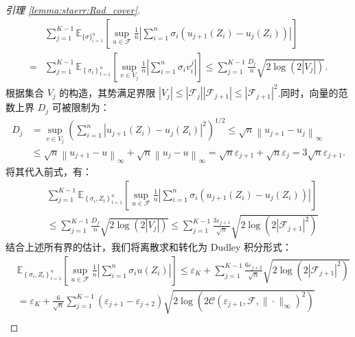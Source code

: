 \begin{proof}[引理 \ref{lemma:staerr:Rad_cover}]
\begin{equation*}
\begin{aligned}
&\sum_{j=1}^{K-1} \mathbb{E}_{\{\sigma\}_{i=1}^{n}}\left[\sup _{u \in \mathcal{F}} \frac{1}{n}\left|\sum_{i=1}^{n} \sigma_{i}\left(u_{j+1}\left(Z_{i}\right)-u_{j}\left(Z_{i}\right)\right)\right|\right]\\
=&\sum_{j=1}^{K-1} \mathbb{E}_{\left\{\sigma_{t}\right\}_{t=1}^{n}}\left[\sup _{v \in V_{j}} \frac{1}{n} \left| \sum_{i=1}^{n} \sigma_{i} v_{i}^{j}\right|\right] \leq \sum_{j=1}^{K-1} \frac{D_{j}}{n} \sqrt{2 \log \left(2\left|V_{j}\right|\right)}.
\end{aligned}
\end{equation*}
根据集合 $V_{j}$ 的构造，其势满足界限 $\left|V_{j}\right| \leq\left|\mathcal{F}_{j}\right|\left|\mathcal{F}_{j+1}\right| \leq\left|\mathcal{F}_{j+1}\right|^{2}$.同时，向量的范数上界 $D_j$ 可被限制为：
$$ \begin{aligned}
     D_j &= \sup_{v \in V_j} \left(\sum_{i=1}^{n}\left|u_{j+1}\left(Z_{i}\right)-u_{j}\left(Z_{i}\right)\right|^{2}\right)^{1 / 2} \leq \sqrt{n}\left\|u_{j+1}-u_{j}\right\|_{\infty} \\ &\leq \sqrt{n}\left\|u_{j+1}-u\right\|_{\infty}+\sqrt{n}\left\|u_{j}-u\right\|_{\infty} = \sqrt{n} \varepsilon_{j+1}+\sqrt{n} \varepsilon_{j} = 3 \sqrt{n} \varepsilon_{j+1}. 
\end{aligned} $$
将其代入前式，有：
\begin{equation*}
\begin{aligned}
&\sum_{j=1}^{K-1} \mathbb{E}_{\left\{\sigma_{i}, Z_{t}\right\}_{t=1}^{n}}\left[\sup _{u \in \mathcal{F}} \frac{1}{n}\left|\sum_{i=1}^{n} \sigma_{i}\left(u_{j+1}\left(Z_{i}\right)-u_{j}\left(Z_{i}\right)\right)\right|\right] \\
&\leq \sum_{j=1}^{K-1} \frac{D_{j}}{n} \sqrt{2 \log \left(2\left|V_{j}\right|\right)} \leq \sum_{j=1}^{K-1} \frac{3 \varepsilon_{j+1}}{\sqrt{n}} \sqrt{2 \log \left(2\left|\mathcal{F}_{j+1}\right|^{2}\right)}
\end{aligned}
\end{equation*}
结合上述所有界的估计，我们将离散求和转化为 Dudley 积分形式：
\begin{equation*}
\begin{aligned}
&\mathbb{E}_{\left\{\sigma_{i}, Z_{i}\right\}_{i=1}^{n}}\left[\sup _{u \in \mathcal{F}} \frac{1}{n}\left|\sum_{i=1}^{n} \sigma_{i} u\left(Z_{i}\right)\right|\right] \leq \varepsilon_{K}+\sum_{j=1}^{K-1} \frac{6 \varepsilon_{j+2}}{\sqrt{n}} \sqrt{2 \log \left(2\left|\mathcal{F}_{j+1}\right|^{2}\right)} \\
&=\varepsilon_{K}+\frac{6}{\sqrt{n}} \sum_{j=1}^{K-1}\left(\varepsilon_{j+1}-\varepsilon_{j+2}\right) \sqrt{2 \log \left(2 \mathcal{C}\left(\varepsilon_{j+1}, \mathcal{F},\|\cdot\|_{\infty}\right)^{2}\right)}\\

\end{aligned}
\end{equation*}
\end{proof}
